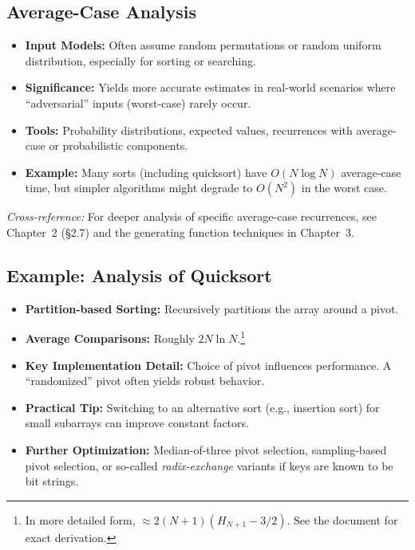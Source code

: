 \documentclass[11pt,letterpaper]{article}
\begin{document}
\subsection{Average-Case Analysis}

\begin{itemize}
  \item \textbf{Input Models:} Often assume random permutations or random uniform distribution, especially for sorting or searching.
  \item \textbf{Significance:} Yields more accurate estimates in real-world scenarios where “adversarial” inputs (worst-case) rarely occur.
  \item \textbf{Tools:} Probability distributions, expected values, recurrences with average-case or probabilistic components.
  \item \textbf{Example:} Many sorts (including quicksort) have \(O(N \log N)\) average-case time, but simpler algorithms might degrade to \(O(N^2)\) in the worst case.
\end{itemize}

\noindent
\emph{Cross-reference:} For deeper analysis of specific average-case recurrences, see Chapter~2 (\S2.7) and the generating function techniques in Chapter~3.

\subsection{Example: Analysis of Quicksort}

\begin{itemize}
  \item \textbf{Partition-based Sorting:} Recursively partitions the array around a pivot.
  \item \textbf{Average Comparisons:} Roughly \(2N \ln N\).\footnote{In more detailed form, \(\approx 2(N+1)(H_{N+1}-3/2)\). See the document for exact derivation.}
  \item \textbf{Key Implementation Detail:} Choice of pivot influences performance. A “randomized” pivot often yields robust behavior.
  \item \textbf{Practical Tip:} Switching to an alternative sort (e.g., insertion sort) for small subarrays can improve constant factors.
  \item \textbf{Further Optimization:} Median-of-three pivot selection, sampling-based pivot selection, or so-called \emph{radix-exchange} variants if keys are known to be bit strings.
\end{itemize}
\end{document}
